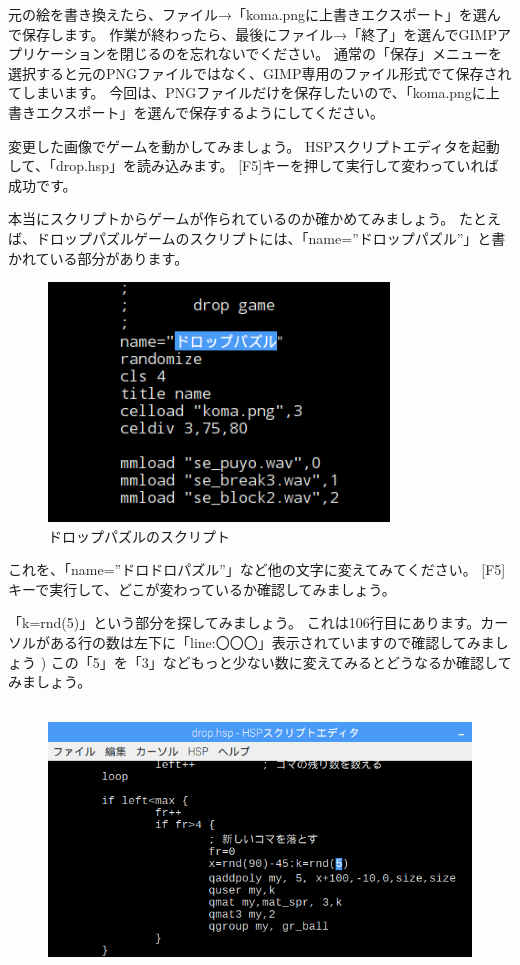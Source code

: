 元の絵を書き換えたら、ファイル→「koma.pngに上書きエクスポート」を選んで保存します。
作業が終わったら、最後にファイル→「終了」を選んでGIMPアプリケーションを閉じるのを忘れないでください。
通常の「保存」メニューを選択すると元のPNGファイルではなく、GIMP専用のファイル形式でて保存されてしまいます。
今回は、PNGファイルだけを保存したいので、「koma.pngに上書きエクスポート」を選んで保存するようにしてください。

変更した画像でゲームを動かしてみましょう。
HSPスクリプトエディタを起動して、「drop.hsp」を読み込みます。
[F5]キーを押して実行して変わっていれば成功です。

本当にスクリプトからゲームが作られているのか確かめてみましょう。
たとえば、ドロップパズルゲームのスクリプトには、「name=”ドロップパズル”」と書かれている部分があります。

\begin{figure}[H]
    \begin{center}
        \includegraphics[keepaspectratio,width=9.049cm,height=6.346cm]{text02-img/text02-img014.png}
        \caption{ドロップパズルのスクリプト}
    \end{center}
\end{figure}

これを、「name=”ドロドロパズル”」など他の文字に変えてみてください。
[F5]キーで実行して、どこが変わっているか確認してみましょう。

「k=rnd(5)」という部分を探してみましょう。
これは106行目にあります。カーソルがある行の数は左下に「line:〇〇〇」表示されていますので確認してみましょう )
この「5」を「3」などもっと少ない数に変えてみるとどうなるか確認してみましょう。

\begin{figure}[H]
    \begin{center}
        \includegraphics[keepaspectratio,width=12.753cm,height=7.064cm]{text02-img/text02-img041.png}
    \end{center}
\end{figure}

